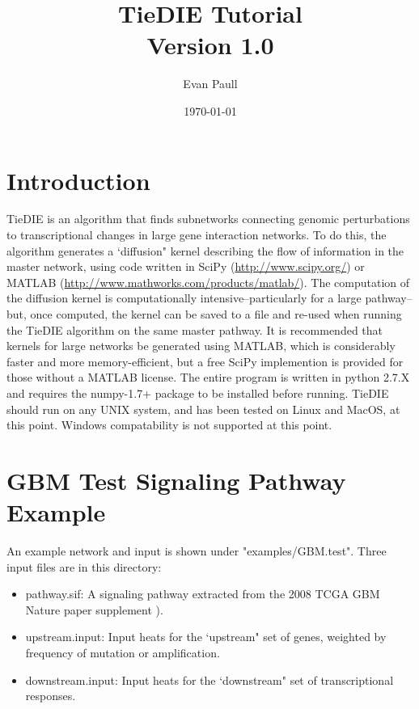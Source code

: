 \documentclass[11pt]{report}
\author{Evan Paull}
\title{TieDIE Tutorial \\ Version 1.0}
\date{\today}
\begin{document}
\maketitle

\singlespace

\chapter*{Introduction}

\noindent TieDIE is an algorithm that finds subnetworks connecting genomic perturbations to transcriptional changes in 
large gene interaction networks. To do this, the algorithm generates a `diffusion" kernel describing
the flow of information in the master network, using code written in SciPy (\url{http://www.scipy.org/}) or 
 MATLAB (\url{http://www.mathworks.com/products/matlab/}). The computation of the diffusion kernel is computationally
intensive--particularly for a large pathway--but, once computed, the kernel can be saved to a file and re-used
when running the TieDIE algorithm on the same master pathway. It is recommended that kernels for large networks
be generated using MATLAB, which is considerably faster and more memory-efficient, but a free SciPy implemention is 
provided for those without a MATLAB license. The entire program is written in python 2.7.X and requires the numpy-1.7+
package to be installed before running. TieDIE should run on any UNIX system, and has been tested on Linux and MacOS, at this 
point. Windows compatability is not supported at this point. 

\chapter*{GBM Test Signaling Pathway Example}

\noindent An example network and input is shown under "examples/GBM.test". Three input files are in this directory: 

	\begin{itemize}
	\item pathway.sif: A signaling pathway extracted from the 2008 TCGA GBM Nature paper supplement \cite{TCGA08}). 
	\item upstream.input: Input heats for the `upstream" set of genes, weighted by frequency of mutation or amplification.
	\item downstream.input: Input heats for the `downstream" set of transcriptional responses. 
	\end{itemize}
\end{document}
